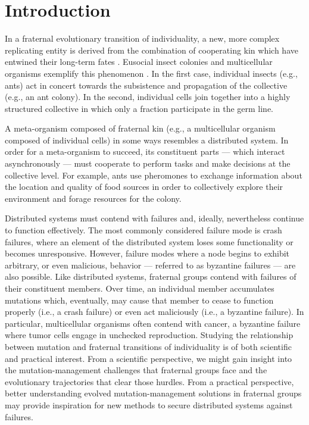\section{Introduction}

In a fraternal evolutionary transition of individuality, a new, more complex replicating entity is derived from the combination of cooperating kin which have entwined their long-term fates \citep{west2015major}.
Eusocial insect colonies and multicellular organisms exemplify this phenomenon  \citep{smith1997major}.
In the first case, individual insects (e.g., ants) act in concert towards the subsistence and propagation of the collective (e.g., an ant colony).
In the second, individual cells join together into a highly structured collective in which only a fraction participate in the germ line.

A meta-organism composed of fraternal kin (e.g., a multicellular organism composed of individual cells) in some ways resembles a distributed system.
In order for a meta-organism to succeed, its constituent parts --- which interact asynchronously --- must cooperate to perform tasks and make decisions at the collective level.
For example, ants use pheromones to exchange information about the location and quality of food sources in order to collectively explore their environment and forage resources for the colony.

Distributed systems must contend with failures and, ideally, nevertheless continue to function effectively.
The most commonly considered failure mode is crash failures, where an element of the distributed system loses some functionality or becomes unresponsive.
However, failure modes where a node begins to exhibit arbitrary, or even malicious, behavior --- referred to as byzantine failures --- are also possible.
Like distributed systems, fraternal groups contend with failures of their constituent members.
Over time, an individual member accumulates mutations which, eventually, may cause that member to cease to function properly (i.e., a crash failure) or even act maliciously (i.e., a byzantine failure).
In particular, multicellular organisms often contend with cancer, a byzantine failure where tumor cells engage in unchecked reproduction.
Studying the relationship between mutation and fraternal transitions of individuality is of both scientific and practical interest.
From a scientific perspective, we might gain insight into the mutation-management challenges that fraternal groups face and the evolutionary trajectories that clear those hurdles.
From a practical perspective, better understanding evolved mutation-management solutions in fraternal groups may provide inspiration for new methods to secure distributed systems against failures.

